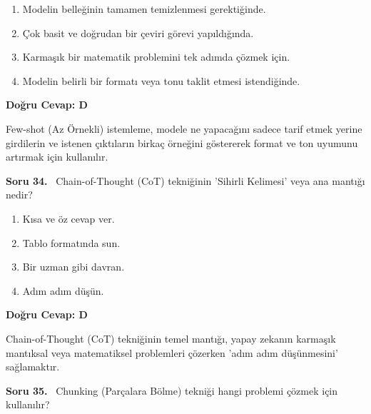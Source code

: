 \documentclass[11pt,a4paper,openany]{book}
\begin{document}
\begin{enumerate}[label=\Alph*), leftmargin=25pt, topsep=4pt, itemsep=2pt]
        \item Modelin belleğinin tamamen temizlenmesi gerektiğinde.
        \item Çok basit ve doğrudan bir çeviri görevi yapıldığında.
        \item Karmaşık bir matematik problemini tek adımda çözmek için.
        \item Modelin belirli bir formatı veya tonu taklit etmesi istendiğinde.
\end{enumerate}

\vspace{4pt}
\begin{tcolorbox}[title=Cevap ve Açıklama, colback=gray!3!white, colframe=primarycolor!90!black, arc=2mm, fonttitle=\bfseries\sffamily, top=6pt, bottom=6pt]
    \textbf{Doğru Cevap: D}
    
    \vspace{2pt}
    Few-shot (Az Örnekli) istemleme, modele ne yapacağını sadece tarif etmek yerine girdilerin ve istenen çıktıların birkaç örneğini göstererek format ve ton uyumunu artırmak için kullanılır.
\end{tcolorbox}
\vspace{10pt}
\needspace{5cm}
\vspace{8pt}
\noindent\textbf{\large\sffamily Soru 34.} \ Chain-of-Thought (CoT) tekniğinin 'Sihirli Kelimesi' veya ana mantığı nedir?

\begin{enumerate}[label=\Alph*), leftmargin=25pt, topsep=4pt, itemsep=2pt]
        \item Kısa ve öz cevap ver.
        \item Tablo formatında sun.
        \item Bir uzman gibi davran.
        \item Adım adım düşün.
\end{enumerate}

\vspace{4pt}
\begin{tcolorbox}[title=Cevap ve Açıklama, colback=gray!3!white, colframe=primarycolor!90!black, arc=2mm, fonttitle=\bfseries\sffamily, top=6pt, bottom=6pt]
    \textbf{Doğru Cevap: D}

    \vspace{2pt}
    Chain-of-Thought (CoT) tekniğinin temel mantığı, yapay zekanın karmaşık mantıksal veya matematiksel problemleri çözerken 'adım adım düşünmesini' sağlamaktır.
\end{tcolorbox}
\vspace{10pt}
\needspace{5cm}
\vspace{8pt}
\noindent\textbf{\large\sffamily Soru 35.} \ Chunking (Parçalara Bölme) tekniği hangi problemi çözmek için kullanılır?
\end{document}
